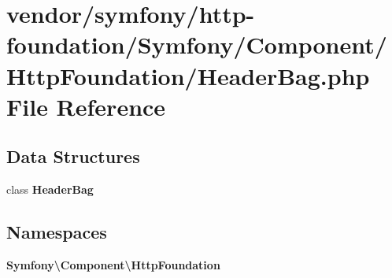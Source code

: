 \section{vendor/symfony/http-\/foundation/\+Symfony/\+Component/\+Http\+Foundation/\+Header\+Bag.php File Reference}
\label{_header_bag_8php}
\subsection*{Data Structures}
\begin{DoxyCompactItemize}
\item 
class {\bf Header\+Bag}
\end{DoxyCompactItemize}
\subsection*{Namespaces}
\begin{DoxyCompactItemize}
\item 
 {\bf Symfony\textbackslash{}\+Component\textbackslash{}\+Http\+Foundation}
\end{DoxyCompactItemize}
